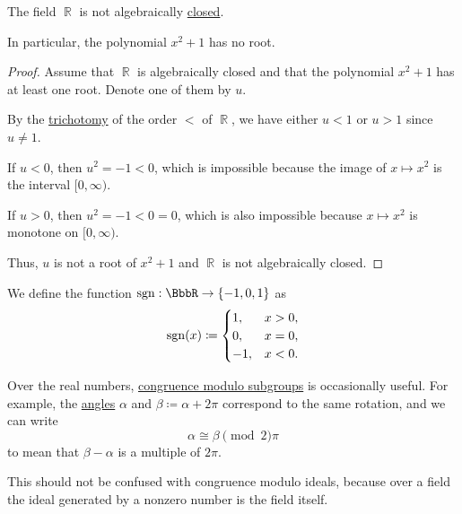 \begin{proposition}\label{thm:reals_not_algebraically_closed}
  The field \( \BbbR \) is not algebraically \hyperref[def:algebraically_closed_field]{closed}.

  In particular, the polynomial \( x^2 + 1 \) has no root.
\end{proposition}
\begin{proof}
  Assume that \( \BbbR \) is algebraically closed and that the polynomial \( x^2 + 1 \) has at least one root. Denote one of them by \( u \).

  By the \hyperref[def:binary_relation/trichotomic]{trichotomy} of the order \( < \) of \( \BbbR \), we have either \( u < 1 \) or \( u > 1 \) since \( u \neq 1 \).

  If \( u < 0 \), then \( u^2 = -1 < 0 \), which is impossible because the image of \( x \mapsto x^2 \) is the interval \( [0, \infty) \).

  If \( u > 0 \), then \( u^2 = -1 < 0 = 0 \), which is also impossible because \( x \mapsto x^2 \) is monotone on \( [0, \infty) \).

  Thus, \( u \) is not a root of \( x^2 + 1 \) and \( \BbbR \) is not algebraically closed.
\end{proof}

\begin{definition}\label{def:signum}
  We define the  function \( \sgn: \BbbR \to \{ -1, 0, 1 \} \) as
  \begin{equation*}
    \operatorname{sgn}(x) \coloneqq \begin{cases}
      1,  & x > 0, \\
      0,  & x = 0, \\
      -1, & x < 0.
    \end{cases}
  \end{equation*}
\end{definition}

\begin{remark}\label{rem:congruence_modulo_real_number}
  Over the real numbers, \hyperref[rem:congruence_modulo_substructure]{congruence modulo subgroups} is occasionally useful. For example, the \hyperref[def:angle]{angles} \( \alpha \) and \( \beta \coloneqq \alpha + 2\pi \) correspond to the same rotation, and we can write
  \begin{equation*}
    \alpha \cong \beta \pmod 2\pi
  \end{equation*}
  to mean that \( \beta - \alpha \) is a multiple of \( 2\pi \).

  This should not be confused with congruence modulo ideals, because over a field the ideal generated by a nonzero number is the field itself.
\end{remark}

